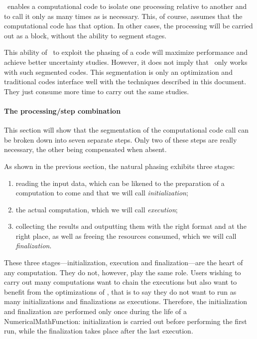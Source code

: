 \OT\ enables a computational code to isolate one processing relative to another and to call it only as many times as is necessary. This, of course, assumes that the computational code has that option. In other cases, the processing will be carried out as a block, without the ability to segment stages.

This ability of \OT\ to exploit the phasing of a code will maximize performance and achieve better uncertainty studies. However, it does not imply that \OT\ only works with such segmented codes. This segmentation is only an optimization and traditional codes interface well with the techniques described in this document. They just consume more time to carry out the same studies.

\paragraph{The processing/step combination}

This section will show that the segmentation of the computational code call can be broken down into seven separate steps. Only two of these steps are really necessary, the other being compensated when absent.

As shown in the previous section, the natural phasing exhibits three stages:

\begin{enumerate}
\item reading the input data, which can be likened to the preparation of a computation to come and that we will call \emph{initialization};
\item the actual computation, which we will call \emph{execution};
\item collecting the results and outputting them with the right format and at the right place, as well as freeing the resources consumed, which we will call \emph{finalization}.
\end{enumerate}

These three stages---initialization, execution and finalization---are the heart of any computation. They do not, however, play the same role. Users wishing to carry out many computations want to chain the executions but also want to benefit from the optimizations of \OT, that is to say they do not want to run as many initializations and finalizations as executions. Therefore, the initialization and finalization are performed only once during the life of a NumericalMathFunction: initialization is carried out before performing the first run, while the finalization takes place after the last execution.

